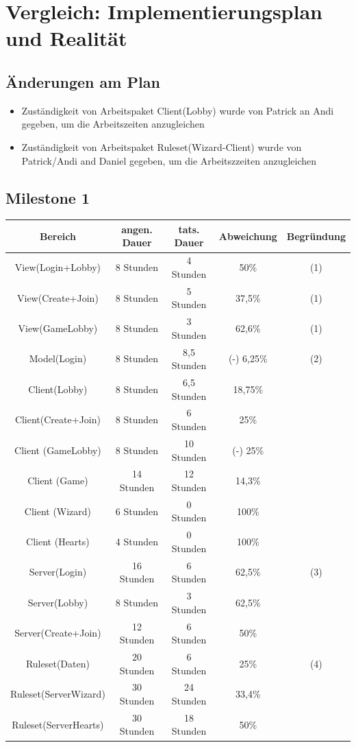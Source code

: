 \documentclass{article}
\begin{document}
\section{Vergleich: Implementierungsplan und Realität}

\subsection{Änderungen am Plan}
\begin{itemize}
\item Zuständigkeit von Arbeitspaket Client(Lobby) wurde von Patrick an Andi gegeben, um die Arbeitszeiten anzugleichen
\item Zuständigkeit von Arbeitspaket Ruleset(Wizard-Client) wurde von Patrick/Andi and Daniel gegeben, um die Arbeitszzeiten anzugleichen
\end{itemize}

\subsection{Milestone 1}

\begin{tabular}{|c|c|c|c|c|}\hline
   Bereich & angen. Dauer & tats. Dauer & Abweichung & Begründung \\ \hline\hline
   View(Login+Lobby) & 8 Stunden & 4 Stunden & 50\% & (1) \\ \hline
   View(Create+Join) & 8 Stunden & 5 Stunden & 37,5\% & (1)\\ \hline
   View(GameLobby) & 8 Stunden & 3 Stunden & 62,6\% & (1)\\ \hline
   Model(Login) & 8 Stunden & 8,5 Stunden & (-) 6,25\% & (2) \\ \hline
   Client(Lobby) & 8 Stunden &  6,5 Stunden & 18,75\% &\\ \hline
   Client(Create+Join) &  8 Stunden & 6 Stunden & 25\% &\\ \hline
   Client (GameLobby) &  8 Stunden & 10 Stunden & (-) 25\% &\\ \hline
   Client (Game) & 14  Stunden &  12 Stunden & 14,3\% &\\ \hline
   Client (Wizard) & 6 Stunden & 0 Stunden & 100\% &\\ \hline
   Client (Hearts) & 4 Stunden & 0 Stunden & 100\% &\\ \hline
   Server(Login) & 16 Stunden & 6 Stunden & 62,5\% & (3) \\ \hline
   Server(Lobby) & 8 Stunden & 3 Stunden & 62,5\% &\\ \hline 
   Server(Create+Join) & 12 Stunden & 6 Stunden & 50\% &\\ \hline 
   Ruleset(Daten) & 20 Stunden & 6 Stunden & 25\% & (4) \\ \hline 
   Ruleset(ServerWizard) & 30 Stunden & 24 Stunden & 33,4\% &\\ \hline 
   Ruleset(ServerHearts) & 30 Stunden & 18 Stunden & 50\% &\\ \hline 
 \end{tabular}
\end{document}
